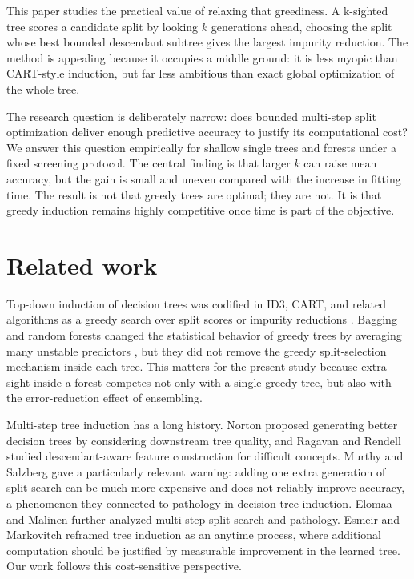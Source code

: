 \documentclass[pdflatex,sn-mathphys-num]{sn-jnl}
\begin{document}
This paper studies the practical value of relaxing that greediness. A k-sighted tree scores a candidate split by looking $k$ generations ahead, choosing the split whose best bounded descendant subtree gives the largest impurity reduction. The method is appealing because it occupies a middle ground: it is less myopic than CART-style induction, but far less ambitious than exact global optimization of the whole tree.

The research question is deliberately narrow: does bounded multi-step split optimization deliver enough predictive accuracy to justify its computational cost? We answer this question empirically for shallow single trees and forests under a fixed screening protocol. The central finding is that larger $k$ can raise mean accuracy, but the gain is small and uneven compared with the increase in fitting time. The result is not that greedy trees are optimal; they are not. It is that greedy induction remains highly competitive once time is part of the objective.

\section{Related work}\label{sec:related}

Top-down induction of decision trees was codified in ID3, CART, and related algorithms as a greedy search over split scores or impurity reductions \cite{quinlan1986induction,breiman1984cart}. Bagging and random forests changed the statistical behavior of greedy trees by averaging many unstable predictors \cite{breiman1996bagging,breiman2001random}, but they did not remove the greedy split-selection mechanism inside each tree. This matters for the present study because extra sight inside a forest competes not only with a single greedy tree, but also with the error-reduction effect of ensembling.

Multi-step tree induction has a long history. Norton \cite{norton1989generating} proposed generating better decision trees by considering downstream tree quality, and Ragavan and Rendell \cite{ragavan1993lookahead} studied descendant-aware feature construction for difficult concepts. Murthy and Salzberg \cite{murthy1995lookahead} gave a particularly relevant warning: adding one extra generation of split search can be much more expensive and does not reliably improve accuracy, a phenomenon they connected to pathology in decision-tree induction. Elomaa and Malinen \cite{elomaa2005lookahead} further analyzed multi-step split search and pathology. Esmeir and Markovitch \cite{esmeir2007anytime} reframed tree induction as an anytime process, where additional computation should be justified by measurable improvement in the learned tree. Our work follows this cost-sensitive perspective.
\end{document}
